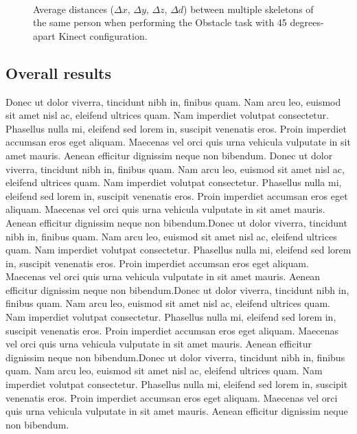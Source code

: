 \documentclass{sigchi}
\begin{document}
\begin{figure}
  \centering

  
   \\
  

  \caption{Average distances ($\Delta x$, $\Delta y$, $\Delta z$, $\Delta d$) between multiple skeletons
    of the same person when performing the Obstacle task with 45 degrees-apart Kinect configuration.}

  \label{fig:results_obstacle}
\end{figure}

\subsection{Overall results}

Donec ut dolor viverra, tincidunt nibh in, finibus quam. Nam arcu leo, euismod sit amet nisl ac, eleifend ultrices quam. Nam imperdiet volutpat consectetur. Phasellus nulla mi, eleifend sed lorem in, suscipit venenatis eros. Proin imperdiet accumsan eros eget aliquam. Maecenas vel orci quis urna vehicula vulputate in sit amet mauris. Aenean efficitur dignissim neque non bibendum.
Donec ut dolor viverra, tincidunt nibh in, finibus quam. Nam arcu leo, euismod sit amet nisl ac, eleifend ultrices quam. Nam imperdiet volutpat consectetur. Phasellus nulla mi, eleifend sed lorem in, suscipit venenatis eros. Proin imperdiet accumsan eros eget aliquam. Maecenas vel orci quis urna vehicula vulputate in sit amet mauris. Aenean efficitur dignissim neque non bibendum.Donec ut dolor viverra, tincidunt nibh in, finibus quam. Nam arcu leo, euismod sit amet nisl ac, eleifend ultrices quam. Nam imperdiet volutpat consectetur. Phasellus nulla mi, eleifend sed lorem in, suscipit venenatis eros. Proin imperdiet accumsan eros eget aliquam. Maecenas vel orci quis urna vehicula vulputate in sit amet mauris. Aenean efficitur dignissim neque non bibendum.Donec ut dolor viverra, tincidunt nibh in, finibus quam. Nam arcu leo, euismod sit amet nisl ac, eleifend ultrices quam. Nam imperdiet volutpat consectetur. Phasellus nulla mi, eleifend sed lorem in, suscipit venenatis eros. Proin imperdiet accumsan eros eget aliquam. Maecenas vel orci quis urna vehicula vulputate in sit amet mauris. Aenean efficitur dignissim neque non bibendum.Donec ut dolor viverra, tincidunt nibh in, finibus quam. Nam arcu leo, euismod sit amet nisl ac, eleifend ultrices quam. Nam imperdiet volutpat consectetur. Phasellus nulla mi, eleifend sed lorem in, suscipit venenatis eros. Proin imperdiet accumsan eros eget aliquam. Maecenas vel orci quis urna vehicula vulputate in sit amet mauris. Aenean efficitur dignissim neque non bibendum.
\end{document}
